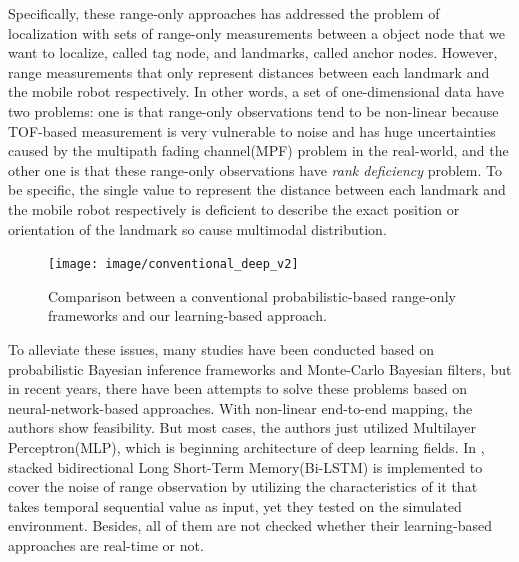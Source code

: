\documentclass[letterpaper, 10 pt, conference]{ieeeconf}  %
\begin{document}
Specifically, these range-only approaches has addressed the problem of localization with sets of range-only measurements between a object node that we want to localize, called tag node, and landmarks, called anchor nodes. However, range measurements that only represent distances between each landmark and the mobile robot respectively. In other words, a set of one-dimensional data have two problems: one is that range-only observations tend to be non-linear because TOF-based measurement is very vulnerable to noise and has huge uncertainties caused by the multipath fading channel(MPF) problem\cite{li2017novel} in the real-world, and the other one is that these range-only observations have \textit{rank deficiency} problem\cite{fabresse2018efficient}. To be specific, the single value to represent the distance between each landmark and the mobile robot respectively is deficient to describe the exact position or orientation of the landmark so cause multimodal distribution\cite{gonzalez2009mobile}. 

\begin{figure}[h]
	
	\centering
	\texttt{[image: image/conventional\_deep\_v2]}
	
	\label{fig:overview}
	
	\caption{Comparison between a conventional probabilistic-based range-only frameworks and our learning-based approach.}
	
\end{figure}

To alleviate these issues, many studies have been conducted based on probabilistic Bayesian inference frameworks and Monte-Carlo Bayesian filters, but in recent years, there have been attempts to solve these problems based on neural-network-based approaches\cite{rahman2009localization, abdelhadi2013efficient, kumar2016localization, lim2018effective}. With non-linear end-to-end mapping, the authors show feasibility. But most cases, the authors just utilized Multilayer Perceptron(MLP), which is beginning architecture of deep learning fields\cite{rahman2009localization, abdelhadi2013efficient, kumar2016localization}. In \cite{lim2018effective}, stacked bidirectional Long Short-Term Memory(Bi-LSTM) is implemented to cover the noise of range observation by utilizing the characteristics of it that takes temporal sequential value as input, yet they tested on the simulated environment. Besides, all of them are not checked whether their learning-based approaches are real-time or not. 
\end{document}
